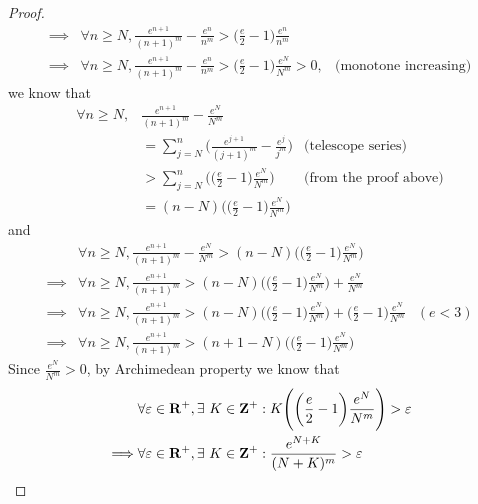 \begin{proof}
\begin{align*}
        \implies & \forall n \geq N, \frac{e^{n + 1}}{(n + 1)^m} - \frac{e^n}{n^m} > \bigg(\frac{e}{2} - 1\bigg) \frac{e^n}{n^m}                                     \\
        \implies & \forall n \geq N, \frac{e^{n + 1}}{(n + 1)^m} - \frac{e^n}{n^m} > \bigg(\frac{e}{2} - 1\bigg) \frac{e^N}{N^m} > 0, & \text{(monotone increasing)}
    \end{align*}
    we know that
    \begin{align*}
        \forall n \geq N, & \frac{e^{n + 1}}{(n + 1)^m} - \frac{e^N}{N^m}                                                              \\
                          & = \sum_{j = N}^n \bigg(\frac{e^{j + 1}}{(j + 1)^m} - \frac{e^j}{j^m}\bigg) & \text{(telescope series)}     \\
                          & > \sum_{j = N}^n \Bigg(\bigg(\frac{e}{2} - 1\bigg) \frac{e^N}{N^m}\Bigg)   & \text{(from the proof above)} \\
                          & = (n - N) \Bigg(\bigg(\frac{e}{2} - 1\bigg) \frac{e^N}{N^m}\Bigg)
    \end{align*}
    and
    \begin{align*}
                 & \forall n \geq N, \frac{e^{n + 1}}{(n + 1)^m} - \frac{e^N}{N^m} > (n - N) \Bigg(\bigg(\frac{e}{2} - 1\bigg) \frac{e^N}{N^m}\Bigg)                                       \\
        \implies & \forall n \geq N, \frac{e^{n + 1}}{(n + 1)^m} > (n - N) \Bigg(\bigg(\frac{e}{2} - 1\bigg) \frac{e^N}{N^m}\Bigg) + \frac{e^N}{N^m}                                       \\
        \implies & \forall n \geq N, \frac{e^{n + 1}}{(n + 1)^m} > (n - N) \Bigg(\bigg(\frac{e}{2} - 1\bigg) \frac{e^N}{N^m}\Bigg) + \bigg(\frac{e}{2} - 1\bigg) \frac{e^N}{N^m} & (e < 3) \\
        \implies & \forall n \geq N, \frac{e^{n + 1}}{(n + 1)^m} > (n + 1 - N) \Bigg(\bigg(\frac{e}{2} - 1\bigg) \frac{e^N}{N^m}\Bigg)
    \end{align*}
    Since \(\frac{e^N}{N^m} > 0\), by Archimedean property we know that
    \begin{align*}
                 & \forall \varepsilon \in \R^+, \exists\ K \in \Z^+ : K \Bigg(\bigg(\frac{e}{2} - 1\bigg) \frac{e^N}{N^m}\Bigg) > \varepsilon                                \\
        \implies & \forall \varepsilon \in \R^+, \exists\ K \in \Z^+ : \frac{e^{N + K}}{(N + K)^m} > \varepsilon                                                              \\

\end{align*}
\end{proof}
